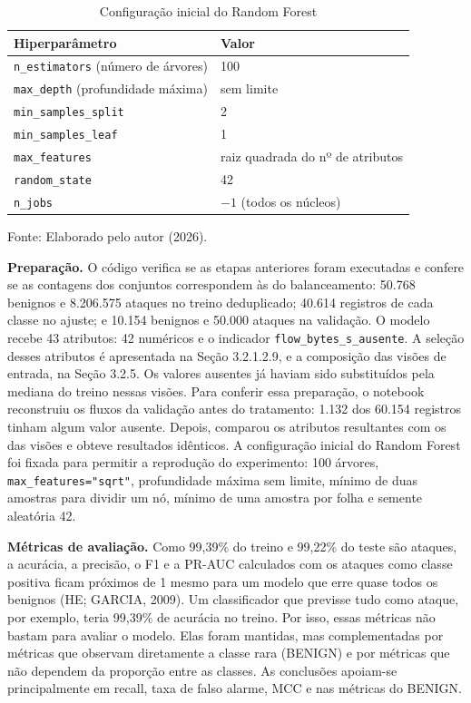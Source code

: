 \documentclass[
    12pt,                %
    openright,           %
    oneside,             %
    a4paper,             %
    english,             %
    brazil               %
]{abntex2}
\begin{document}
\begin{table}
\centering
\caption{Configuração inicial do Random Forest}
\label{tab:configuracao-inicial-rf}
\begin{tabular}{ll}
\hline
Hiperparâmetro & Valor \\
\hline
\texttt{n\_estimators} (número de árvores) & 100 \\
\texttt{max\_depth} (profundidade máxima) & sem limite \\
\texttt{min\_samples\_split} & 2 \\
\texttt{min\_samples\_leaf} & 1 \\
\texttt{max\_features} & raiz quadrada do nº de atributos \\
\texttt{random\_state} & 42 \\
\texttt{n\_jobs} & $-1$ (todos os núcleos) \\
\hline
\end{tabular}
\par\smallskip
Fonte: Elaborado pelo autor (2026).
\end{table}

\textbf{Preparação.} O código verifica se as etapas anteriores foram executadas e confere se as contagens dos conjuntos correspondem às do balanceamento: 50.768 benignos e 8.206.575 ataques no treino deduplicado; 40.614 registros de cada classe no ajuste; e 10.154 benignos e 50.000 ataques na validação. O modelo recebe 43 atributos: 42 numéricos e o indicador \texttt{flow\_bytes\_s\_ausente}. A seleção desses atributos é apresentada na Seção 3.2.1.2.9, e a composição das visões de entrada, na Seção 3.2.5. Os valores ausentes já haviam sido substituídos pela mediana do treino nessas visões. Para conferir essa preparação, o notebook reconstruiu os fluxos da validação antes do tratamento: 1.132 dos 60.154 registros tinham algum valor ausente. Depois, comparou os atributos resultantes com os das visões e obteve resultados idênticos. A configuração inicial do Random Forest foi fixada para permitir a reprodução do experimento: 100 árvores, \texttt{max\_features="sqrt"}, profundidade máxima sem limite, mínimo de duas amostras para dividir um nó, mínimo de uma amostra por folha e semente aleatória 42.

\textbf{Métricas de avaliação.} Como 99,39\% do treino e 99,22\% do teste são ataques, a acurácia, a precisão, o F1 e a PR-AUC calculados com os ataques como classe positiva ficam próximos de 1 mesmo para um modelo que erre quase todos os benignos (HE; GARCIA, 2009). Um classificador que previsse tudo como ataque, por exemplo, teria 99,39\% de acurácia no treino. Por isso, essas métricas não bastam para avaliar o modelo. Elas foram mantidas, mas complementadas por métricas que observam diretamente a classe rara (BENIGN) e por métricas que não dependem da proporção entre as classes. As conclusões apoiam-se principalmente em recall, taxa de falso alarme, MCC e nas métricas do BENIGN.
\end{document}
